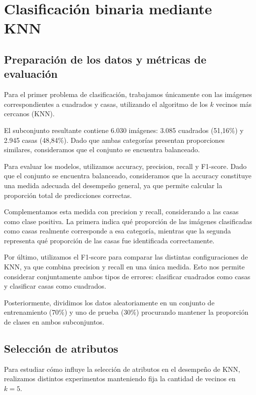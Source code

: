 \documentclass[11pt,a4paper]{article}
\begin{document}
\section{Clasificación binaria mediante KNN}

\subsection{Preparación de los datos y métricas de evaluación}


Para el primer problema de clasificación, trabajamos
únicamente con las imágenes correspondientes a cuadrados y casas, utilizando el algoritmo
de los $k$ vecinos más cercanos (KNN).

El subconjunto resultante contiene 6.030 imágenes:
3.085 cuadrados (51,16\%) y 2.945 casas (48,84\%).
Dado que ambas categorías presentan proporciones
similares, consideramos que el conjunto se encuentra
balanceado.

Para evaluar los modelos, utilizamos accuracy,
precision, recall y F1-score. Dado que el conjunto
se encuentra balanceado, consideramos que la
accuracy constituye una medida adecuada del
desempeño general, ya que permite calcular la
proporción total de predicciones correctas.

Complementamos esta medida con precision y recall,
considerando a las casas como clase positiva.
La primera indica qué proporción de las imágenes
clasificadas como casas realmente corresponde a
esa categoría, mientras que la segunda representa
qué proporción de las casas fue identificada
correctamente.

Por último, utilizamos el F1-score para comparar
las distintas configuraciones de KNN, ya que
combina precision y recall en una única medida.
Esto nos permite considerar conjuntamente
ambos tipos de errores: clasificar cuadrados
como casas y clasificar casas como cuadrados.


Posteriormente, dividimos los datos aleatoriamente
en un conjunto de entrenamiento (70\%) y uno
de prueba (30\%) procurando mantener la proporción
de clases en ambos subconjuntos.

\subsection{Selección de atributos}

Para estudiar cómo influye la selección de atributos
en el desempeño de KNN, realizamos distintos
experimentos manteniendo fija la cantidad de vecinos
en $k=5$.
\end{document}
